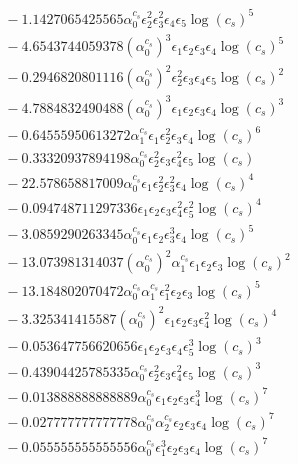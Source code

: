 \documentclass[10pt]{article}
\begin{document}
\begin{align*}
&{}  - 1.1427065425565 \alpha_{0}^{c_s} \epsilon_{2}^{2} \epsilon_{3}^{2} \epsilon_{4} \epsilon_{5} \log{\left(c_{s} \right)}^{5} \\
&{}  - 4.6543744059378 \left(\alpha_{0}^{c_s}\right)^{3} \epsilon_{1} \epsilon_{2} \epsilon_{3} \epsilon_{4} \log{\left(c_{s} \right)}^{5} \\
&{}  - 0.2946820801116 \left(\alpha_{0}^{c_s}\right)^{2} \epsilon_{2}^{2} \epsilon_{3} \epsilon_{4} \epsilon_{5} \log{\left(c_{s} \right)}^{2} \\
&{}  - 4.7884832490488 \left(\alpha_{0}^{c_s}\right)^{3} \epsilon_{1} \epsilon_{2} \epsilon_{3} \epsilon_{4} \log{\left(c_{s} \right)}^{3} \\
&{}  - 0.64555950613272 \alpha_{1}^{c_s} \epsilon_{1} \epsilon_{2}^{2} \epsilon_{3} \epsilon_{4} \log{\left(c_{s} \right)}^{6} \\
&{}  - 0.33320937894198 \alpha_{0}^{c_s} \epsilon_{2}^{2} \epsilon_{3} \epsilon_{4}^{2} \epsilon_{5} \log{\left(c_{s} \right)} \\
&{}  - 22.578658817009 \alpha_{0}^{c_s} \epsilon_{1} \epsilon_{2}^{2} \epsilon_{3}^{2} \epsilon_{4} \log{\left(c_{s} \right)}^{4} \\
&{}  - 0.094748711297336 \epsilon_{1} \epsilon_{2} \epsilon_{3} \epsilon_{4}^{2} \epsilon_{5}^{2} \log{\left(c_{s} \right)}^{4} \\
&{}  - 3.0859290263345 \alpha_{0}^{c_s} \epsilon_{1} \epsilon_{2} \epsilon_{3}^{3} \epsilon_{4} \log{\left(c_{s} \right)}^{5} \\
&{}  - 13.073981314037 \left(\alpha_{0}^{c_s}\right)^{2} \alpha_{1}^{c_s} \epsilon_{1} \epsilon_{2} \epsilon_{3} \log{\left(c_{s} \right)}^{2} \\
&{}  - 13.184802070472 \alpha_{0}^{c_s} \alpha_{1}^{c_s} \epsilon_{1}^{2} \epsilon_{2} \epsilon_{3} \log{\left(c_{s} \right)}^{5} \\
&{}  - 3.325341415587 \left(\alpha_{0}^{c_s}\right)^{2} \epsilon_{1} \epsilon_{2} \epsilon_{3} \epsilon_{4}^{2} \log{\left(c_{s} \right)}^{4} \\
&{}  - 0.053647756620656 \epsilon_{1} \epsilon_{2} \epsilon_{3} \epsilon_{4} \epsilon_{5}^{3} \log{\left(c_{s} \right)}^{3} \\
&{}  - 0.43904425785335 \alpha_{0}^{c_s} \epsilon_{2}^{2} \epsilon_{3} \epsilon_{4}^{2} \epsilon_{5} \log{\left(c_{s} \right)}^{3} \\
&{}  - 0.013888888888889 \alpha_{0}^{c_s} \epsilon_{1} \epsilon_{2} \epsilon_{3} \epsilon_{4}^{3} \log{\left(c_{s} \right)}^{7} \\
&{}  - 0.027777777777778 \alpha_{0}^{c_s} \alpha_{2}^{c_s} \epsilon_{2} \epsilon_{3} \epsilon_{4} \log{\left(c_{s} \right)}^{7} \\
&{}  - 0.055555555555556 \alpha_{0}^{c_s} \epsilon_{1}^{3} \epsilon_{2} \epsilon_{3} \epsilon_{4} \log{\left(c_{s} \right)}^{7}
\end{align*}
\end{document}
